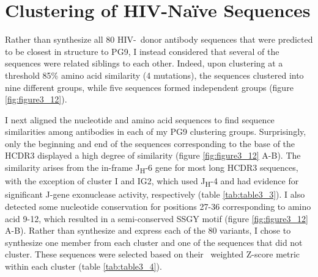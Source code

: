 \section{Clustering of HIV-Na\"{i}ve  Sequences}
Rather than synthesize all 80 HIV-\naive~donor antibody sequences that were predicted to be closest in structure to PG9, I instead considered that several of the sequences were related siblings to each other. Indeed, upon clustering at a threshold 85\% amino acid similarity (4 mutations), the sequences clustered into nine different groups, while five sequences formed independent groups (figure \ref{fig:figure3_12}).

I next aligned the nucleotide and amino acid sequences to find sequence similarities among antibodies in each of my PG9 clustering groups. Surprisingly, only the beginning and end of the sequences corresponding to the base of the HCDR3 displayed a high degree of similarity (figure \ref{fig:figure3_12} A-B). The similarity arises from the in-frame J\textsubscript{H}-6 gene for most long HCDR3 sequences, with the exception of cluster I and IG2, which used J\textsubscript{H}-4 and had evidence for significant J-gene exonuclease activity, respectively (table \ref{tab:table3_3}). I also detected some nucleotide conservation for positions 27-36 corresponding to amino acid 9-12, which resulted in a semi-conserved SSGY motif (figure \ref{fig:figure3_12} A-B). Rather than synthesize and express each of the 80 variants, I chose to synthesize one member from each cluster and one of the sequences that did not cluster. These sequences were selected based on their \rosetta~weighted Z-score metric within each cluster (table \ref{tab:table3_4}).

